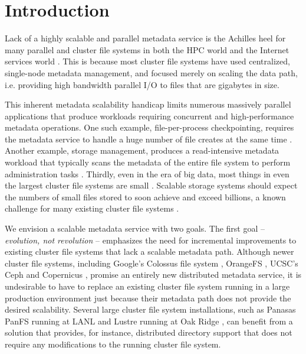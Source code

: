 \section{Introduction}





Lack of a highly scalable and parallel metadata service is the
Achilles heel for many parallel and cluster file systems in both the HPC world
\cite{hpcs-io:2008, hecfsio:tr06} and the Internet services world \cite{HDFS}.
This is because most cluster file systems have used centralized, single-node
metadata management, and focused merely on scaling the data path,
i.e. providing high bandwidth parallel I/O to files that are gigabytes in size.


This inherent metadata scalability handicap limits numerous massively parallel
applications that produce workloads
requiring concurrent and high-performance metadata operations.
One such example, file-per-process checkpointing, requires the metadata service to
handle a huge number of file creates at the same time \cite{PLFS}.
Another example, storage management, produces a read-intensive metadata workload
that typically scans the metadata of the entire file system to perform
administration tasks \cite{filemgmt-ucsc, magellan-ucsc}.
Thirdly, even in the era of big data,
most things in even the largest cluster file systems are small
\cite{Dayal, brent13}.
Scalable storage systems should expect the numbers of small files stored
to soon achieve and exceed billions,
a known challenge for many existing cluster file systems \cite{GIGA11}.

We envision a scalable metadata service with two goals.
The first goal -- \textit{evolution, not revolution} -- emphasizes the need for
incremental improvements to existing cluster file systems that lack a
scalable metadata path.
Although newer cluster file systems, including Google's Colossus file system
\cite{50mfiles-in-googlefs:fikes10}, OrangeFS \cite{OrangeFS}, UCSC's Ceph \cite{ceph:weil06} and 
Copernicus \cite{sfs-ucsc}, promise an entirely new distributed metadata
service, it is undesirable to have to replace an existing cluster file system
running in a large production environment
just because their metadata path does not provide the desired scalability.
Several large cluster file system installations, such as Panasas PanFS running
at LANL \cite{PanFS} and Lustre running at Oak Ridge
\cite{shipman2010, wang09}, can benefit from a solution that provides,
for instance, distributed directory support
that does not require any modifications to the running cluster file system.

